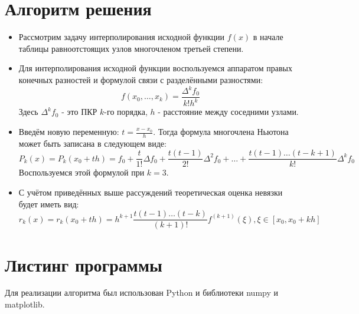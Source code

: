 \documentclass[14pt, a4paper]{article}
\begin{document}
  \section{Алгоритм решения}
  \begin{itemize}
     \item
     Рассмотрим задачу интерполирования исходной функции $f(x)$ в начале таблицы равноотстоящих узлов многочленом третьей степени.
     \item 
     Для интерполирования исходной функции воспользуемся аппаратом правых конечных разностей и формулой связи с разделёнными разностями: \begin{equation}f(x_0, \dots, x_k) = \frac{\Delta^kf_0}{k!h^k} \end{equation}
     Здесь $\Delta^kf_0$ - это ПКР $k$-го порядка, $h$ - расстояние между соседними узлами.
     \item
     Введём новую переменную: $t = \frac{x-x_0}{h}$. Тогда формула многочлена Ньютона может быть записана в следующем виде: \begin{equation}P_k(x) = P_k(x_0+th) = f_0 + \frac{t}{1!}\Delta f_0 + \frac{t(t-1)}{2!}\Delta^2f_0 + \dots + \frac{t(t-1)\dots(t-k+1)}{k!}\Delta^kf_0\end{equation}
     Воспользуемся этой формулой при $k=3$.
     \item
     С учётом приведённых выше рассуждений теоретическая оценка невязки будет иметь вид: \begin{equation}r_k(x) = r_k(x_0 + th) = h^{k+1}\frac{t(t-1)\dots(t-k)}{(k+1)!}f^{(k+1)}(\xi), \xi \in [x_0, x_0 + kh]\end{equation}
  \end{itemize}
  \section{Листинг программы}
  Для реализации алгоритма был использован Python и библиотеки numpy и matplotlib.
\end{document}

